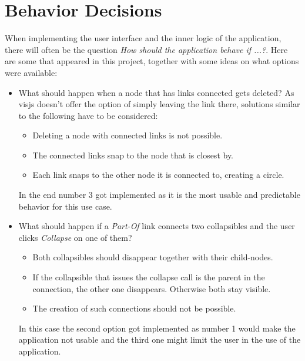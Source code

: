\newpage
\section{Behavior Decisions}
When implementing the user interface and the inner logic of the application, there will often be the question \emph{How should the application behave if ...?}. Here are some that appeared in this project, together with some ideas on what options were available:
\begin{itemize}
\item What should happen when a node that has links connected gets deleted? As visjs doesn't offer the option of simply leaving the link there, solutions similar to the following have to be considered:
\begin{itemize}
\item Deleting a node with connected links is not possible.
\item The connected links snap to the node that is closest by.
\item Each link snaps to the other node it is connected to, creating a circle.
\end{itemize}
In the end number 3 got implemented as it is the most usable and predictable behavior for this use case.

\item What should happen if a \emph{Part-Of} link connects two collapsibles and the user clicks \emph{Collapse} on one of them?
\begin{itemize}
\item Both collapsibles should disappear together with their child-nodes.
\item If the collapsible that issues the collapse call is the parent in the connection, the other one disappears. Otherwise both stay visible.
\item The creation of such connections should not be possible.
\end{itemize}
In this case the second option got implemented as number 1 would make the application not usable and the third one might limit the user in the use of the application.


\end{itemize}
